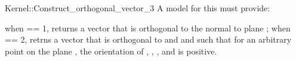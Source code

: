 \begin{ccRefFunctionObjectConcept}{Kernel::Construct_orthogonal_vector_3}
A model for this must provide:


{when  == 1, returns a vector  that is orthogonal to the 
 normal  to plane ; when  == 2, retrns a vector 
  that is orthogonal to  and  and such that
 for an arbitrary point  on the plane , the orientation of
 , , , and  is positive.}

\end{ccRefFunctionObjectConcept}
